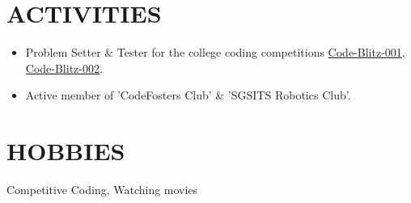\documentclass[line, margin]{res}
\begin{document}
\begin{resume}
\section{ACTIVITIES}
\begin{itemize}
\item Problem Setter \& Tester for the college coding competitions \href{https://www.hackerrank.com/contests/code-blitz-001/challenges}{Code-Blitz-001}, \href{https://www.hackerrank.com/contests/code-blitz-002/challenges}{Code-Blitz-002}.
\item Active member of 'CodeFosters Club' \& 'SGSITS Robotics Club'.
\end{itemize}

\section{HOBBIES}
Competitive Coding, Watching movies

\end{resume}
\end{document}
